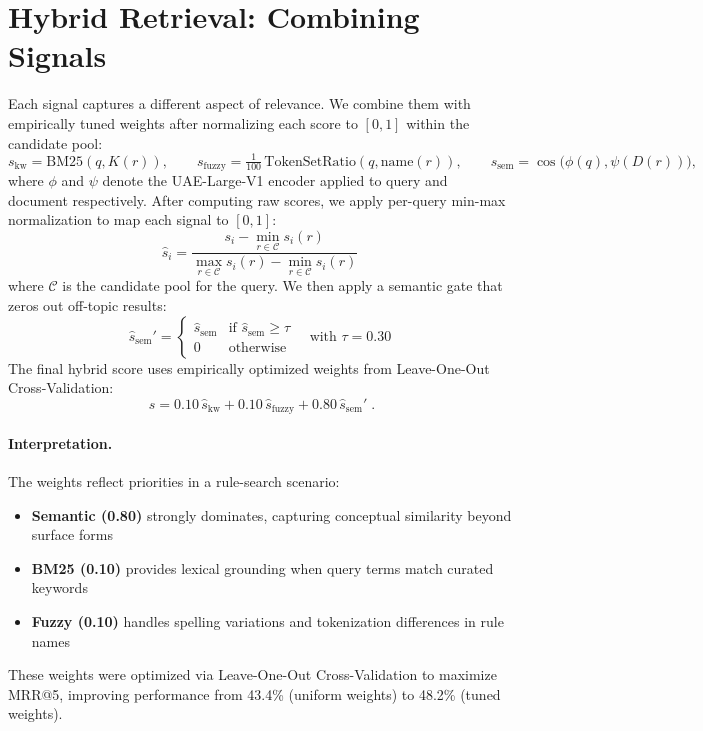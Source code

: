 \section{Hybrid Retrieval: Combining Signals}
\label{sec:hybrid-combination}
Each signal captures a different aspect of relevance. We combine them with empirically tuned weights after normalizing each score to $[0,1]$ within the candidate pool:
\[
s_{\text{kw}} = \mathrm{BM25}(q, K(r)),\qquad
s_{\text{fuzzy}} = \tfrac{1}{100}\,\mathrm{TokenSetRatio}(q, \mathrm{name}(r)),\qquad
s_{\text{sem}} = \cos\!\big(\phi(q), \psi(D(r))\big),
\]
where $\phi$ and $\psi$ denote the UAE-Large-V1 encoder applied to query and document respectively. After computing raw scores, we apply per-query min-max normalization to map each signal to $[0,1]$:
\[
\widehat{s}_i = \frac{s_i - \min_{r \in \mathcal{C}} s_i(r)}{\max_{r \in \mathcal{C}} s_i(r) - \min_{r \in \mathcal{C}} s_i(r)}
\]
where $\mathcal{C}$ is the candidate pool for the query. We then apply a semantic gate that zeros out off-topic results:
\[
\widehat{s}_{\text{sem}}' = \begin{cases}
\widehat{s}_{\text{sem}} & \text{if } \widehat{s}_{\text{sem}} \ge \tau \\
0 & \text{otherwise}
\end{cases} \quad \text{with } \tau = 0.30
\]
The final hybrid score uses empirically optimized weights from Leave-One-Out Cross-Validation:
\[
\boxed{ \; s = 0.10\,\widehat{s}_{\text{kw}} + 0.10\,\widehat{s}_{\text{fuzzy}} + 0.80\,\widehat{s}_{\text{sem}}' \; }.
\]

\paragraph{Interpretation.} The weights reflect priorities in a rule-search scenario:
\begin{itemize}[leftmargin=*,itemsep=2pt,topsep=2pt]
 \item \textbf{Semantic (0.80)} strongly dominates, capturing conceptual similarity beyond surface forms
 \item \textbf{BM25 (0.10)} provides lexical grounding when query terms match curated keywords
 \item \textbf{Fuzzy (0.10)} handles spelling variations and tokenization differences in rule names
\end{itemize}
These weights were optimized via Leave-One-Out Cross-Validation to maximize MRR@5, improving performance from 43.4\% (uniform weights) to 48.2\% (tuned weights).

